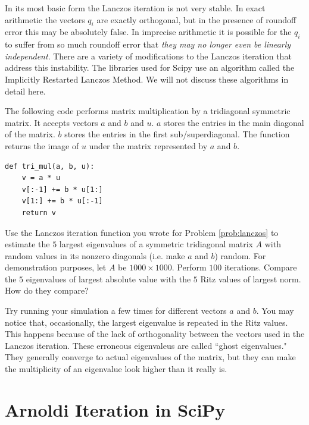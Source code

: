 In its most basic form the Lanczos iteration is not very stable.
In exact arithmetic the vectors $q_i$ are exactly orthogonal, but in the presence of roundoff error this may be absolutely false.
In imprecise arithmetic it is possible for the $q_i$ to suffer from so much roundoff error that \textit{they may no longer even be linearly independent}.
There are a variety of modifications to the Lanczos iteration that address this instability.
The libraries used for Scipy use an algorithm called the Implicitly Restarted Lanczos Method.
We will not discuss these algorithms in detail here.


\begin{problem}
The following code performs matrix multiplication by a tridiagonal symmetric matrix.
It accepts vectors $a$ and $b$ and $u$.
$a$ stores the entries in the main diagonal of the matrix.
$b$ stores the entries in the first sub/superdiagonal.
The function returns the image of $u$ under the matrix represented by $a$ and $b$.

\begin{lstlisting}
def tri_mul(a, b, u):
    v = a * u
    v[:-1] += b * u[1:]
    v[1:] += b * u[:-1]
    return v
\end{lstlisting}

Use the Lanczos iteration function you wrote for Problem \ref{prob:lanczos} to estimate the $5$ largest eigenvalues of a symmetric tridiagonal matrix $A$ with random values in its nonzero diagonals (i.e. make $a$ and $b$) random.
For demonstration purposes, let $A$ be $1000 \times 1000$.
Perform $100$ iterations.
Compare the $5$ eigenvalues of largest absolute value with the $5$ Ritz values of largest norm.
How do they compare?

Try running your simulation a few times for different vectors $a$ and $b$.
You may notice that, occasionally, the largest eigenvalue is repeated in the Ritz values.
This happens because of the lack of orthogonality between the vectors used in the Lanczos iteration.
These erroneous eigenvaleus are called ``ghost eigenvalues."
They generally converge to actual eigenvalues of the matrix, but they can make the multiplicity of an eigenvalue look higher than it really is.
\end{problem}

\section*{Arnoldi Iteration in SciPy}

